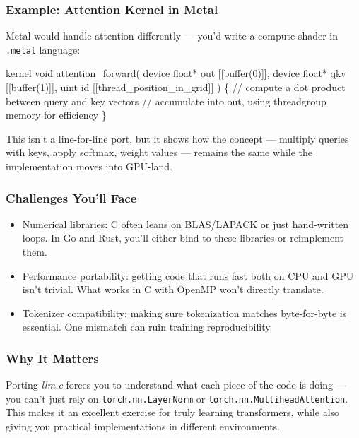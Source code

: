 \documentclass[
  letterpaper,
  DIV=11,
  numbers=noendperiod]{scrreprt}
\newenvironment{Shaded}{\begin{snugshade}}{\end{snugshade}}
\newcommand{\NormalTok}[1]{\textcolor[rgb]{0.00,0.23,0.31}{#1}}
\providecommand{\tightlist}{%
  \setlength{\itemsep}{0pt}\setlength{\parskip}{0pt}}
\begin{document}
\subsubsection{Example: Attention Kernel in
Metal}\label{example-attention-kernel-in-metal}

Metal would handle attention differently --- you'd write a compute
shader in \texttt{.metal} language:

\begin{Shaded}
\begin{Highlighting}[]
\NormalTok{kernel void attention\_forward(}
\NormalTok{    device float* out [[buffer(0)]],}
\NormalTok{    device float* qkv [[buffer(1)]],}
\NormalTok{    uint id [[thread\_position\_in\_grid]]}
\NormalTok{) \{}
\NormalTok{    // compute a dot product between query and key vectors}
\NormalTok{    // accumulate into out, using threadgroup memory for efficiency}
\NormalTok{\}}
\end{Highlighting}
\end{Shaded}

This isn't a line-for-line port, but it shows how the concept ---
multiply queries with keys, apply softmax, weight values --- remains the
same while the implementation moves into GPU-land.

\subsubsection{Challenges You'll Face}\label{challenges-youll-face}

\begin{itemize}
\tightlist
\item
  Numerical libraries: C often leans on BLAS/LAPACK or just hand-written
  loops. In Go and Rust, you'll either bind to these libraries or
  reimplement them.
\item
  Performance portability: getting code that runs fast both on CPU and
  GPU isn't trivial. What works in C with OpenMP won't directly
  translate.
\item
  Tokenizer compatibility: making sure tokenization matches
  byte-for-byte is essential. One mismatch can ruin training
  reproducibility.
\end{itemize}

\subsubsection{Why It Matters}\label{why-it-matters-63}

Porting \emph{llm.c} forces you to understand what each piece of the
code is doing --- you can't just rely on \texttt{torch.nn.LayerNorm} or
\texttt{torch.nn.MultiheadAttention}. This makes it an excellent
exercise for truly learning transformers, while also giving you
practical implementations in different environments.
\end{document}

